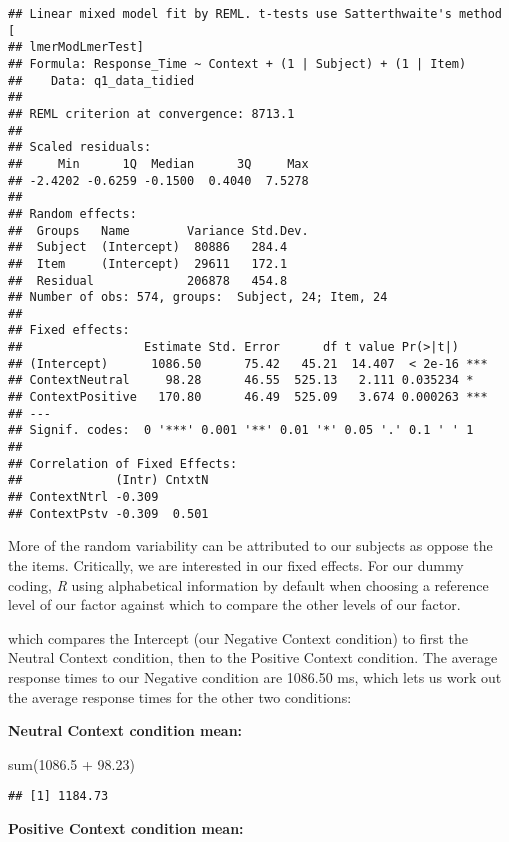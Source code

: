 \documentclass[
]{article}
\newenvironment{Shaded}{\begin{snugshade}}{\end{snugshade}}
\newcommand{\FloatTok}[1]{\textcolor[rgb]{0.00,0.00,0.81}{#1}}
\newcommand{\FunctionTok}[1]{\textcolor[rgb]{0.00,0.00,0.00}{#1}}
\newcommand{\NormalTok}[1]{#1}
\newcommand{\SpecialCharTok}[1]{\textcolor[rgb]{0.00,0.00,0.00}{#1}}
\begin{document}
\begin{verbatim}
## Linear mixed model fit by REML. t-tests use Satterthwaite's method [
## lmerModLmerTest]
## Formula: Response_Time ~ Context + (1 | Subject) + (1 | Item)
##    Data: q1_data_tidied
## 
## REML criterion at convergence: 8713.1
## 
## Scaled residuals: 
##     Min      1Q  Median      3Q     Max 
## -2.4202 -0.6259 -0.1500  0.4040  7.5278 
## 
## Random effects:
##  Groups   Name        Variance Std.Dev.
##  Subject  (Intercept)  80886   284.4   
##  Item     (Intercept)  29611   172.1   
##  Residual             206878   454.8   
## Number of obs: 574, groups:  Subject, 24; Item, 24
## 
## Fixed effects:
##                 Estimate Std. Error      df t value Pr(>|t|)    
## (Intercept)      1086.50      75.42   45.21  14.407  < 2e-16 ***
## ContextNeutral     98.28      46.55  525.13   2.111 0.035234 *  
## ContextPositive   170.80      46.49  525.09   3.674 0.000263 ***
## ---
## Signif. codes:  0 '***' 0.001 '**' 0.01 '*' 0.05 '.' 0.1 ' ' 1
## 
## Correlation of Fixed Effects:
##             (Intr) CntxtN
## ContextNtrl -0.309       
## ContextPstv -0.309  0.501
\end{verbatim}

More of the random variability can be attributed to our subjects as
oppose the the items. Critically, we are interested in our fixed
effects. For our dummy coding, \emph{R} using alphabetical information
by default when choosing a reference level of our factor against which
to compare the other levels of our factor.

which compares the Intercept (our Negative Context condition) to first
the Neutral Context condition, then to the Positive Context condition.
The average response times to our Negative condition are 1086.50 ms,
which lets us work out the average response times for the other two
conditions:

\textbf{Neutral Context condition mean:}

\begin{Shaded}
\begin{Highlighting}[]
\FunctionTok{sum}\NormalTok{(}\FloatTok{1086.5} \SpecialCharTok{+} \FloatTok{98.23}\NormalTok{)}
\end{Highlighting}
\end{Shaded}

\begin{verbatim}
## [1] 1184.73
\end{verbatim}

\textbf{Positive Context condition mean:}
\end{document}
